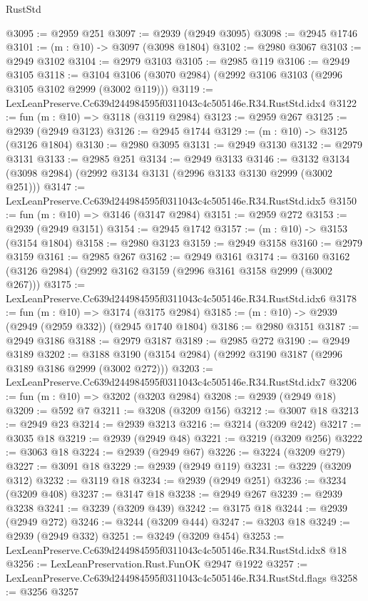 \begin{lexlean}{RustStd}
\begin{coremodule}
@3095 := @2959 @251
@3097 := @2939 (@2949 @3095)
@3098 := @2945 @1746
@3101 := (m : @10) -> @3097 (@3098 @1804)
@3102 := @2980 @3067
@3103 := @2949 @3102
@3104 := @2979 @3103
@3105 := @2985 @119
@3106 := @2949 @3105
@3118 := @3104 @3106 (@3070 @2984) (@2992 @3106 @3103 (@2996 @3105 @3102 @2999 (@3002 @119)))
@3119 := LexLeanPreserve.Cc639d244984595f0311043c4c505146e.R34.RustStd.idx4
@3122 := fun (m : @10) => @3118 (@3119 @2984)
@3123 := @2959 @267
@3125 := @2939 (@2949 @3123)
@3126 := @2945 @1744
@3129 := (m : @10) -> @3125 (@3126 @1804)
@3130 := @2980 @3095
@3131 := @2949 @3130
@3132 := @2979 @3131
@3133 := @2985 @251
@3134 := @2949 @3133
@3146 := @3132 @3134 (@3098 @2984) (@2992 @3134 @3131 (@2996 @3133 @3130 @2999 (@3002 @251)))
@3147 := LexLeanPreserve.Cc639d244984595f0311043c4c505146e.R34.RustStd.idx5
@3150 := fun (m : @10) => @3146 (@3147 @2984)
@3151 := @2959 @272
@3153 := @2939 (@2949 @3151)
@3154 := @2945 @1742
@3157 := (m : @10) -> @3153 (@3154 @1804)
@3158 := @2980 @3123
@3159 := @2949 @3158
@3160 := @2979 @3159
@3161 := @2985 @267
@3162 := @2949 @3161
@3174 := @3160 @3162 (@3126 @2984) (@2992 @3162 @3159 (@2996 @3161 @3158 @2999 (@3002 @267)))
@3175 := LexLeanPreserve.Cc639d244984595f0311043c4c505146e.R34.RustStd.idx6
@3178 := fun (m : @10) => @3174 (@3175 @2984)
@3185 := (m : @10) -> @2939 (@2949 (@2959 @332)) (@2945 @1740 @1804)
@3186 := @2980 @3151
@3187 := @2949 @3186
@3188 := @2979 @3187
@3189 := @2985 @272
@3190 := @2949 @3189
@3202 := @3188 @3190 (@3154 @2984) (@2992 @3190 @3187 (@2996 @3189 @3186 @2999 (@3002 @272)))
@3203 := LexLeanPreserve.Cc639d244984595f0311043c4c505146e.R34.RustStd.idx7
@3206 := fun (m : @10) => @3202 (@3203 @2984)
@3208 := @2939 (@2949 @18)
@3209 := @592 @7
@3211 := @3208 (@3209 @156)
@3212 := @3007 @18
@3213 := @2949 @23
@3214 := @2939 @3213
@3216 := @3214 (@3209 @242)
@3217 := @3035 @18
@3219 := @2939 (@2949 @48)
@3221 := @3219 (@3209 @256)
@3222 := @3063 @18
@3224 := @2939 (@2949 @67)
@3226 := @3224 (@3209 @279)
@3227 := @3091 @18
@3229 := @2939 (@2949 @119)
@3231 := @3229 (@3209 @312)
@3232 := @3119 @18
@3234 := @2939 (@2949 @251)
@3236 := @3234 (@3209 @408)
@3237 := @3147 @18
@3238 := @2949 @267
@3239 := @2939 @3238
@3241 := @3239 (@3209 @439)
@3242 := @3175 @18
@3244 := @2939 (@2949 @272)
@3246 := @3244 (@3209 @444)
@3247 := @3203 @18
@3249 := @2939 (@2949 @332)
@3251 := @3249 (@3209 @454)
@3253 := LexLeanPreserve.Cc639d244984595f0311043c4c505146e.R34.RustStd.idx8 @18
@3256 := LexLeanPreservation.Rust.FunOK @2947 @1922
@3257 := LexLeanPreserve.Cc639d244984595f0311043c4c505146e.R34.RustStd.flags
@3258 := @3256 @3257

\end{coremodule}
\end{lexlean}
